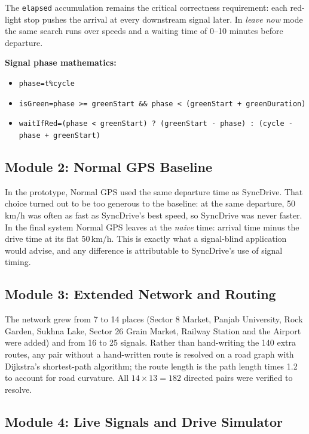 \documentclass[12pt,a4paper]{report}
\begin{document}
The \texttt{elapsed} accumulation remains the critical correctness
requirement: each red-light stop pushes the arrival at every downstream signal
later. In \emph{leave now} mode the same search runs over speeds and a waiting
time of 0--10 minutes before departure.

\textbf{Signal phase mathematics:}
\begin{itemize}
  \item \texttt{phase\;=\;t\;\%\;cycle}
  \item \texttt{isGreen\;=\;phase >= greenStart \&\& phase < (greenStart + greenDuration)}
  \item \texttt{waitIfRed\;=\;(phase < greenStart) ? (greenStart - phase) : (cycle - phase + greenStart)}
\end{itemize}

\subsection{Module 2: Normal GPS Baseline}

In the prototype, Normal GPS used the same departure time as SyncDrive. That
choice turned out to be too generous to the baseline: at the same departure,
50\,km/h was often as fast as SyncDrive's best speed, so SyncDrive was never
faster. In the final system Normal GPS leaves at the \textit{naive} time:
arrival time minus the drive time at its flat 50\,km/h. This is exactly what a
signal-blind application would advise, and any difference is attributable to
SyncDrive's use of signal timing.

\subsection{Module 3: Extended Network and Routing}

The network grew from 7 to 14 places (Sector 8 Market, Panjab University, Rock
Garden, Sukhna Lake, Sector 26 Grain Market, Railway Station and the Airport
were added) and from 16 to 25 signals. Rather than hand-writing the 140 extra
routes, any pair without a hand-written route is resolved on a road graph with
Dijkstra's shortest-path algorithm; the route length is the path length times
1.2 to account for road curvature. All $14\times13=182$ directed pairs were
verified to resolve.

\subsection{Module 4: Live Signals and Drive Simulator}
\end{document}
